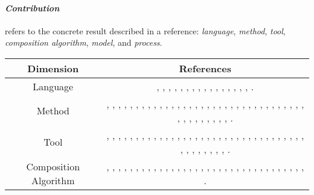 \paragraph {\bf\em Contribution} 
refers to the concrete result described in a reference: {\em language},	{\em method}, 	{\em tool}, {\em 	composition algorithm}, {\em	model}, and	{\em process}.
\begin{table}\centering
\footnotesize
\begin{tabular}{|c|c|}\hline
\textbf{Dimension} & \textbf{References} \\ \hline
Language	& 
\parbox{0.6\textwidth}{\cite{p006}, \cite{p019}, \cite{p033}, \cite{p046}, \cite{p050}, \cite{p058}, \cite{p067}, \cite{p069}, \cite{p083}, \cite{p087}, \cite{p090},  \cite{p098}, \cite{p099}, \cite{p100}, \cite{p109}, \cite{p149}, \cite{p151}.}
\\ \hline
Method	& 
\parbox{0.6\textwidth}{\cite{p008}, \cite{p010}, \cite{p012}, \cite{p015}, \cite{p016},  \cite{p017}, \cite{p023}, \cite{p025}, \cite{p035}, \cite{p036}, \cite{p037}, \cite{p043}, \cite{p044}, \cite{p045}, \cite{p048}, \cite{p065}, \cite{p077}, \cite{p078}, \cite{p079}, \cite{p082}, \cite{p084}, \cite{p085},  \cite{p086}, \cite{p089}, \cite{p093}, \cite{p095}, \cite{p102}, \cite{p108}, \cite{p112}, \cite{p115}, \cite{p118}, \cite{p119}, \cite{p134}, \cite{p135}, \cite{p138}, \cite{p140}, \cite{p143}, \cite{p146}, \cite{p147}, \cite{p148}, \cite{p149}, \cite{p151}, \cite{p154}, \cite{p166}.}
\\ \hline
Tool		&
\parbox{0.6\textwidth}{\cite{p007},  \cite{p009}, \cite{p020}, \cite{p021}, \cite{p030}, \cite{p032}, \cite{p038}, \cite{p039}, \cite{p057}, \cite{p059}, \cite{p063}, \cite{p064}, \cite{p066}, \cite{p071}, \cite{p073}, \cite{p075}, \cite{p076}, \cite{p080}, \cite{p081}, \cite{p091}, \cite{p094}, \cite{p105}, \cite{p106}, \cite{p107}, \cite{p111}, \cite{p113}, \cite{p114}, \cite{p116}, \cite{p121}, \cite{p122}, \cite{p124}, \cite{p125}, \cite{p126}, \cite{p129}, \cite{p130}, \cite{p151}, \cite{p156}, \cite{p158}, \cite{p159}, \cite{p160}, \cite{p165}, \cite{p167}, \cite{p169}.}
\\ \hline
Composition Algorithm		&
\parbox{0.6\textwidth}{\cite{p001}, \cite{p002}, \cite{p003}, \cite{p004}, \cite{p007}, \cite{p008}, \cite{p018}, \cite{p026}, \cite{p027}, \cite{p051}, \cite{p060}, \cite{p062}, \cite{p068}, \cite{p092}, \cite{p097}, \cite{p103}, \cite{p104}, \cite{p116}, \cite{p117}, \cite{p118}, \cite{p120}, \cite{p122}, \cite{p123}, \cite{p125}, \cite{p127}, \cite{p131}, \cite{p132}, \cite{p133}, \cite{p137}, \cite{p144}, \cite{p145}, \cite{p153}, \cite{p155}, \cite{p157}, \cite{p165}.}

\end{tabular}
\end{table}
